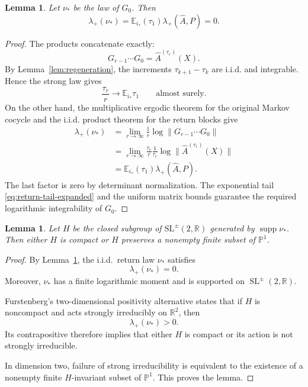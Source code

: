 \documentclass[11pt,a4paper]{amsart}
\newtheorem{lemma}[theorem]{Lemma}
\theoremstyle{definition}
\theoremstyle{remark}
\numberwithin{equation}{section}
\newcommand{\PP}{\mathbb P}
\newcommand{\RR}{\mathbb R}
\newcommand{\EE}{\mathbb E}
\newcommand{\1}{\boldsymbol 1}
\def\SL{\operatorname{SL}}
\begin{document}
\begin{lemma}%
\label{lem:return-exponent}
Let $\nu_*$ be the law of $G_0$.  Then
\begin{equation}\label{eq:return-exponent}
 \lambda_+(\nu_*)=\EE_{i_*}(\tau_1)\lambda_+(\widehat A,P)=0.
\end{equation}
\end{lemma}

\begin{proof}
The products concatenate exactly:
\begin{equation}\label{eq:return-products-concatenate}
 G_{r-1}\cdots G_0=\widehat A^{(\tau_r)}(X).
\end{equation}
By Lemma~\ref{lem:regeneration}, the increments
$\tau_{k+1}-\tau_k$ are i.i.d. and integrable.  Hence the strong law
gives
\begin{equation}\label{eq:return-time-slln-expanded}
 \frac{\tau_r}{r}\longrightarrow\EE_{i_*}\tau_1
 \qquad\text{almost surely}.
\end{equation}
On the other hand, the multiplicative ergodic theorem for the original
Markov cocycle and the i.i.d. product theorem for the return blocks give
\begin{align*}
 \lambda_+(\nu_*)
 &=\lim_{r\to\infty}\frac1r
   \log\|G_{r-1}\cdots G_0\|\\
 &=\lim_{r\to\infty}
   \frac{\tau_r}{r}
   \frac1{\tau_r}\log\|\widehat A^{(\tau_r)}(X)\|\\
 &=\EE_{i_*}(\tau_1)\lambda_+(\widehat A,P).
\end{align*}
The last factor is zero by determinant normalization.  The exponential
tail \eqref{eq:return-tail-expanded} and the uniform matrix bounds
guarantee the required logarithmic integrability of $G_0$.
\end{proof}



\begin{lemma}%
\label{lem:return-group}
Let $H$ be the closed subgroup of
$\mathrm{SL}^{\pm}(2,\RR)$ generated by $\operatorname{supp}\nu_*$.
Then either $H$ is compact or $H$ preserves a nonempty finite subset of $\PP^1$.
\end{lemma}

\begin{proof}
By Lemma~\ref{lem:return-exponent}, the i.i.d.\ return law
$\nu_*$ satisfies
$$
 \lambda_+(\nu_*)=0.
$$
Moreover, $\nu_*$ has a finite logarithmic moment and is supported
on $\SL^\pm(2,\RR)$.

Furstenberg's two-dimensional positivity alternative \cite[Theorem~6.11]{Viana} states that if $H$ is noncompact and acts
strongly irreducibly on $\RR^2$, then
$$
 \lambda_+(\nu_*)>0.
$$
Its contrapositive therefore implies that either $H$ is compact or
its action is not strongly irreducible.

In dimension two, failure of strong irreducibility is equivalent to
the existence of a nonempty finite $H$-invariant subset of
$\PP^1$.  This proves the lemma.
\end{proof}
\end{document}
